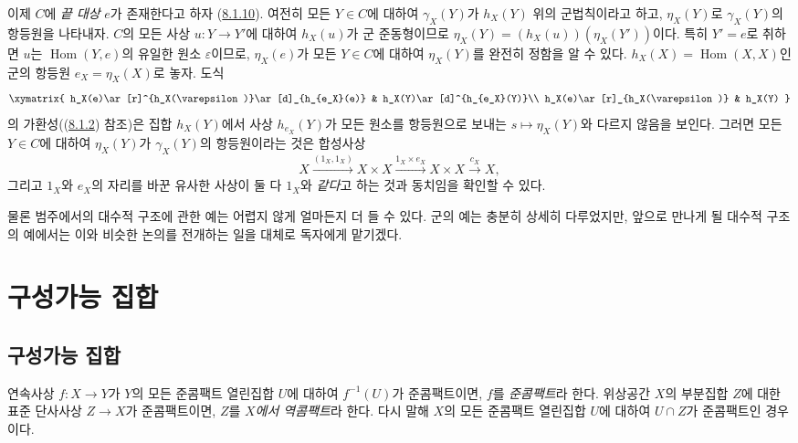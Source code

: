 \begin{env}[8.2.7]
\label{0.8.2.7-ko}
이제 $C$에 \emph{끝 대상} $e$가 존재한다고 하자
(\hyperref[0.8.1.10-fr]{8.1.10}). 여전히 모든 $Y\in C$에 대하여
$\gamma_X(Y)$가 $h_X(Y)$ 위의 군법칙이라고 하고, $\eta_X(Y)$로
$\gamma_X(Y)$의 항등원을 나타내자. $C$의 모든 사상 $u:Y\to Y'$에
대하여 $h_X(u)$가 군 준동형이므로
$\eta_X(Y)=(h_X(u))(\eta_X(Y'))$이다. 특히 $Y'=e$로 취하면 $u$는
$\operatorname{Hom}(Y,e)$의 유일한 원소 $\varepsilon$이므로,
$\eta_X(e)$가 모든 $Y\in C$에 대하여 $\eta_X(Y)$를 완전히 정함을 알 수
있다. $h_X(X)=\operatorname{Hom}(X,X)$인 군의 항등원
$e_X=\eta_X(X)$로 놓자. 도식
\[
  \xymatrix{
    h_X(e)\ar[r]^{h_X(\varepsilon)}\ar[d]_{h_{e_X}(e)} &
    h_X(Y)\ar[d]^{h_{e_X}(Y)}\\
    h_X(e)\ar[r]_{h_X(\varepsilon)} & h_X(Y)
  }
\]
의 가환성((\hyperref[0.8.1.2-fr]{8.1.2}) 참조)은 집합 $h_X(Y)$에서
사상 $h_{e_X}(Y)$가 모든 원소를 항등원으로 보내는
$s\mapsto\eta_X(Y)$와 다르지 않음을 보인다. 그러면 모든 $Y\in C$에
대하여 $\eta_X(Y)$가 $\gamma_X(Y)$의 항등원이라는 것은 합성사상
\[
  X\xrightarrow{(1_X,1_X)}X\times X
  \xrightarrow{1_X\times e_X}X\times X\xrightarrow{c_X}X,
\]
그리고 $1_X$와 $e_X$의 자리를 바꾼 유사한 사상이 둘 다 $1_X$와
\emph{같다}고 하는 것과 동치임을 확인할 수 있다.
\end{env}

\begin{env}[8.2.8]
\label{0.8.2.8-ko}
물론 범주에서의 대수적 구조에 관한 예는 어렵지 않게 얼마든지 더 들 수
있다. 군의 예는 충분히 상세히 다루었지만, 앞으로 만나게 될 대수적 구조의
예에서는 이와 비슷한 논의를 전개하는 일을 대체로 독자에게 맡기겠다.
\end{env}

\section{구성가능 집합}
\label{section:0.9-ko}

\subsection{구성가능 집합}
\label{subsection:0.9.1-ko}

\begin{definition}[9.1.1]
\label{0.9.1.1-ko}
연속사상 $f:X\to Y$가 $Y$의 모든 준콤팩트 열린집합 $U$에 대하여
$f^{-1}(U)$가 준콤팩트이면, $f$를 \emph{준콤팩트}라 한다. 위상공간
$X$의 부분집합 $Z$에 대한 표준 단사사상 $Z\to X$가 준콤팩트이면,
$Z$를 \emph{$X$에서 역콤팩트}라 한다. 다시 말해 $X$의 모든 준콤팩트
열린집합 $U$에 대하여 $U\cap Z$가 준콤팩트인 경우이다.
\end{definition}

